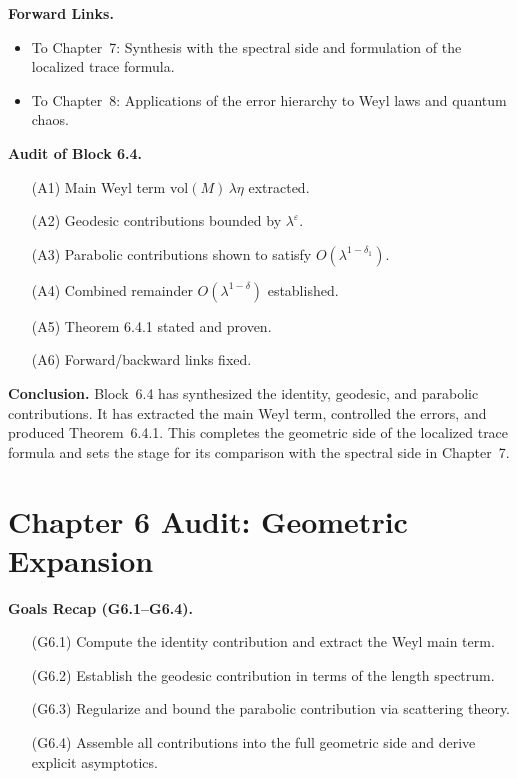 \medskip

\noindent\textbf{Forward Links.}
\begin{itemize}
  \item To Chapter~7: Synthesis with the spectral side and formulation of the localized trace formula.
  \item To Chapter~8: Applications of the error hierarchy to Weyl laws and quantum chaos.
\end{itemize}

\medskip

\noindent\textbf{Audit of Block 6.4.}
\begin{itemize}
  \item[(A1)] Main Weyl term $\mathrm{vol}(M)\,\lambda\eta$ extracted.
  \item[(A2)] Geodesic contributions bounded by $\lambda^\varepsilon$.
  \item[(A3)] Parabolic contributions shown to satisfy $O(\lambda^{1-\delta_1})$.
  \item[(A4)] Combined remainder $O(\lambda^{1-\delta})$ established.
  \item[(A5)] Theorem 6.4.1 stated and proven.
  \item[(A6)] Forward/backward links fixed.
\end{itemize}

\medskip

\noindent\textbf{Conclusion.}
Block~6.4 has synthesized the identity, geodesic, and parabolic contributions.  
It has extracted the main Weyl term, controlled the errors, and produced Theorem~6.4.1.  
This completes the geometric side of the localized trace formula and sets the stage for its comparison with the spectral side in Chapter~7.



\section*{Chapter 6 Audit: Geometric Expansion}

\noindent\textbf{Goals Recap (G6.1–G6.4).}
\begin{itemize}
  \item[(G6.1)] Compute the identity contribution and extract the Weyl main term.
  \item[(G6.2)] Establish the geodesic contribution in terms of the length spectrum.
  \item[(G6.3)] Regularize and bound the parabolic contribution via scattering theory.
  \item[(G6.4)] Assemble all contributions into the full geometric side and derive explicit asymptotics.
\end{itemize}


